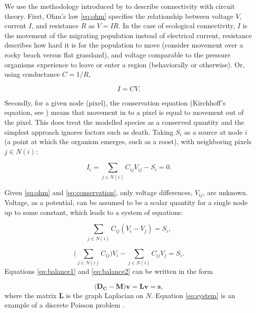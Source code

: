 \documentclass[11pt, a4paper]{article}
\begin{document}
We use the methodology introduced by \cite{mcrae2006isolation} to describe connectivity with circuit theory. First, Ohm's law \cite[Ch. 2]{alexander2007fundamentals} \eqref{eq:ohm} specifies the relationship between voltage $V$, current $I$, and resistance $R$ as $V=IR$. In the case of ecological connectivity, $I$ is the movement of the migrating population instead of electrical current, resistance describes how hard it is for the population to move (consider movement over a rocky beach versus flat grassland), and voltage comparable to the pressure organisms experience to leave or enter a region (behaviorally or otherwise). Or, using conductance $C = 1/R$,

\begin{equation}
\label{eq:ohm}
I = CV.
\end{equation}

Secondly, for a given node (pixel), the conservation equation (Kirchhoff's equation, see \cite[Ch. 2]{alexander2007fundamentals}) means that movement in to a pixel is equal to movement out of the pixel. This does treat the modelled species as a conserved quantity and the simplest approach ignores factors such as death. Taking $S_i$ as a source at node $i$ (a point at which the organism emerges, such as a roost), with neighboring pixels $j \in N(i)$:

\begin{equation}
\label{eq:conservation}
I_i = \sum_{j \in N(i)} C_{ij}V_{ij} - S_i = 0.
\end{equation}

Given \eqref{eq:ohm} and \eqref{eq:conservation}, only voltage differences, $V_{ij}$, are unknown. Voltage, as a potential, can be assumed to be a scalar quantity for a single node up to some constant, which leads to a system of equations:

\begin{equation}
\label{eq:balance1}
\sum_{j \in N(i)} C_{ij}(V_i - V_j) = S_i,
\end{equation}

\begin{equation}
\label{eq:balance2}
\Big(\sum_{j \in N(i)} C_{ij}\Big)V_i - \sum_{j \in N(i)} C_{ij}V_j = S_i.
\end{equation}
Equations \eqref{eq:balance1} and \eqref{eq:balance2} can be written in the form

\begin{equation}
\label{eq:system}
\Big(\mathbf{D_C}- \mathbf{M}\Big)\mathbf{v} = \mathbf{L}\mathbf{v} = \mathbf{s},
\end{equation}
where the matrix $\mathbf{L}$ is the graph Laplacian on $N$. Equation \eqref{eq:system} is an example of a discrete Poisson problem \cite[Ch. 4]{leveque2007finite}. 
\end{document}
